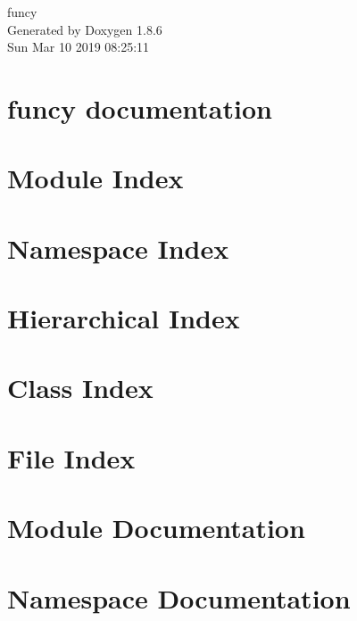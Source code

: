 \documentclass[twoside]{book}
\newcommand{\clearemptydoublepage}{%
  \newpage{\pagestyle{empty}\cleardoublepage}%
}
\begin{document}
\hypersetup{pageanchor=false}
\begin{titlepage}
\vspace*{7cm}
\begin{center}%
{\Large funcy }\\
\vspace*{1cm}
{\large Generated by Doxygen 1.8.6}\\
\vspace*{0.5cm}
{\small Sun Mar 10 2019 08:25:11}\\
\end{center}
\end{titlepage}
\clearemptydoublepage
\tableofcontents
\clearemptydoublepage
{}
\hypersetup{pageanchor=true}

\chapter{funcy documentation}
\label{index}\hypertarget{index}{}
\chapter{Module Index}

\chapter{Namespace Index}

\chapter{Hierarchical Index}

\chapter{Class Index}

\chapter{File Index}

\chapter{Module Documentation}










\chapter{Namespace Documentation}












\end{document}
